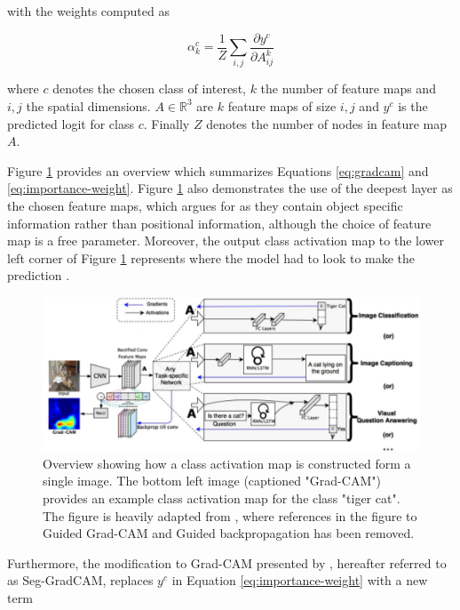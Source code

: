 \documentclass[../main/thesis.tex]{subfiles}
\begin{document}
with the weights computed as

\begin{equation}
    \label{eq:importance-weight}
    \alpha_k^c = \frac{1}{Z} \sum_{i,j} \frac{\partial{y^c}}{\partial{A_{ij}^k}}
\end{equation}

where $c$ denotes the chosen class of interest, $k$ the number of feature maps and $i,j$ the spatial dimensions. $A \in \mathbb{R}^3$ are $k$ feature maps of size $i,j$ and $y^c$ is the predicted logit for class $c$. Finally $Z$ denotes the number of nodes in feature map $A$. 

Figure \ref{fig:gradcam} provides an overview which summarizes Equations \ref{eq:gradcam} and \ref{eq:importance-weight}. Figure \ref{fig:gradcam} also demonstrates the use of the deepest layer as the chosen feature maps, which \citet{Selvaraju2016} argues for as they contain object specific information rather than positional information, although the choice of feature map is a free parameter. Moreover, the output class activation map to the lower left corner of Figure \ref{fig:gradcam} represents where the model had to look to make the prediction \citep{Selvaraju2016}.

\begin{figure}
    \centering
    \includegraphics[width=\textwidth]{GradCAM}
    \caption{\label{fig:gradcam}Overview showing how a class activation map is constructed form a single image. The bottom left image (captioned "Grad-CAM") provides an example class activation map for the class "tiger cat". The figure is heavily adapted from \protect\citet{Selvaraju2016}, where references in the figure to Guided Grad-CAM and Guided backpropagation has been removed.}
\end{figure}

Furthermore, the modification to Grad-CAM presented by \citet{Vinogradova2020}, hereafter referred to as Seg-GradCAM, replaces $y^c$ in Equation \ref{eq:importance-weight} with a new term 
\end{document}
